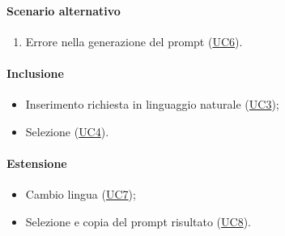 \paragraph*{Scenario alternativo}
\begin{enumerate}
  \item Errore nella generazione del prompt (\hyperref[UC6]{UC6}).
\end{enumerate}

\paragraph*{Inclusione}
\begin{itemize}
  \item Inserimento richiesta in linguaggio naturale (\hyperref[UC3]{UC3});
  \item Selezione  (\hyperref[UC4]{UC4}).
\end{itemize}

\paragraph*{Estensione}
\begin{itemize}
  \item Cambio lingua (\hyperref[UC7]{UC7});
  \item Selezione e copia del prompt risultato (\hyperref[UC8]{UC8}).
\end{itemize}
